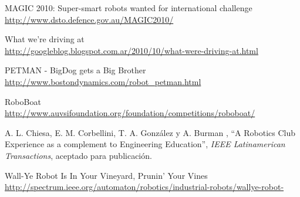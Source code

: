 \documentclass[a4paper,12pt]{article}
\begin{document}
\begin{thebibliography}{99}
MAGIC 2010: Super-smart robots wanted for international challenge \\
\url{http://www.dsto.defence.gov.au/MAGIC2010/}

What we're driving at \\
\url{http://googleblog.blogspot.com.ar/2010/10/what-were-driving-at.html}

PETMAN - BigDog gets a Big Brother \\
\url{http://www.bostondynamics.com/robot_petman.html}

RoboBoat \\
\url{http://www.auvsifoundation.org/foundation/competitions/roboboat/}

A. L. Chiesa, E. M. Corbellini, T. A. González y A. Burman , ``A Robotics Club Experience as a complement to Engineering Education'', \textit{IEEE Latinamerican Transactions}, aceptado para publicación.

Wall-Ye Robot Is In Your Vineyard, Prunin' Your Vines \\
\url{http://spectrum.ieee.org/automaton/robotics/industrial-robots/wallye-robot-}

\end{thebibliography}
\end{document}
